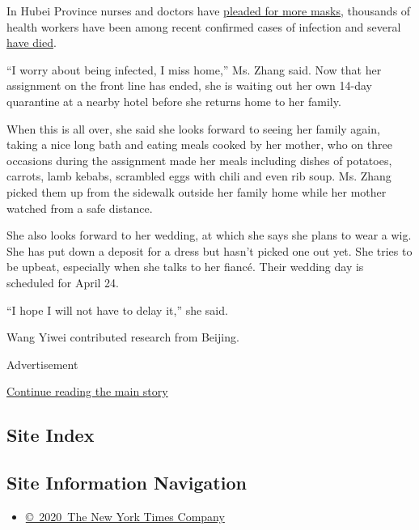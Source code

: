 In Hubei Province nurses and doctors have
\href{https://www.nytimes3xbfgragh.onion/2020/02/14/world/asia/china-coronavirus-doctors.html}{pleaded
for more masks}, thousands of health workers have been among recent
confirmed cases of infection and several
\href{https://www.nytimes3xbfgragh.onion/2020/02/06/world/asia/chinese-doctor-Li-Wenliang-coronavirus.html}{have
died}.

``I worry about being infected, I miss home,'' Ms. Zhang said. Now that
her assignment on the front line has ended, she is waiting out her own
14-day quarantine at a nearby hotel before she returns home to her
family.

When this is all over, she said she looks forward to seeing her family
again, taking a nice long bath and eating meals cooked by her mother,
who on three occasions during the assignment made her meals including
dishes of potatoes, carrots, lamb kebabs, scrambled eggs with chili and
even rib soup. Ms. Zhang picked them up from the sidewalk outside her
family home while her mother watched from a safe distance.

She also looks forward to her wedding, at which she says she plans to
wear a wig. She has put down a deposit for a dress but hasn't picked one
out yet. She tries to be upbeat, especially when she talks to her
fiancé. Their wedding day is scheduled for April 24.

``I hope I will not have to delay it,'' she said.

Wang Yiwei contributed research from Beijing.

Advertisement

\protect\hyperlink{after-bottom}{Continue reading the main story}

\hypertarget{site-index}{%
\subsection{Site Index}\label{site-index}}

\hypertarget{site-information-navigation}{%
\subsection{Site Information
Navigation}\label{site-information-navigation}}

\begin{itemize}
\tightlist
\item
  \href{https://help.nytimes3xbfgragh.onion/hc/en-us/articles/115014792127-Copyright-notice}{©~2020~The
  New York Times Company}
\end{itemize}

